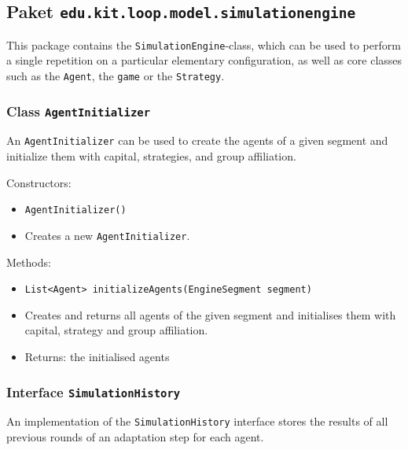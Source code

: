 \documentclass[parskip=full,11pt]{scrartcl}
\begin{document}
\subsection{Paket \texttt{edu.kit.loop.model.simulationengine}}

This package contains the \texttt{SimulationEngine}-class, which can be used to perform a single repetition on a particular elementary configuration, as well as core classes such as the \texttt{Agent}, the \texttt{game} or the \texttt{Strategy}.

\subsubsection{Class \texttt{AgentInitializer}}
An \texttt{AgentInitializer} can be used to create the agents of a given segment and initialize them with capital, strategies, and group affiliation.

Constructors:
\begin{itemize}\itemsep -10pt
\item \texttt{AgentInitializer()}
\item[] Creates a new \texttt{AgentInitializer}.
\end{itemize}

Methods:
\begin{itemize}\itemsep -10pt
\item \texttt{List<Agent> initializeAgents(EngineSegment segment)}
\item[] Creates and returns all agents of the given segment and initialises them with capital, strategy and group affiliation.
\item[] Returns: the initialised agents
\end{itemize}

\subsubsection{Interface \texttt{SimulationHistory}}
An implementation of the \texttt{SimulationHistory} interface stores the results of all previous rounds of an adaptation step for each agent.
\end{document}
